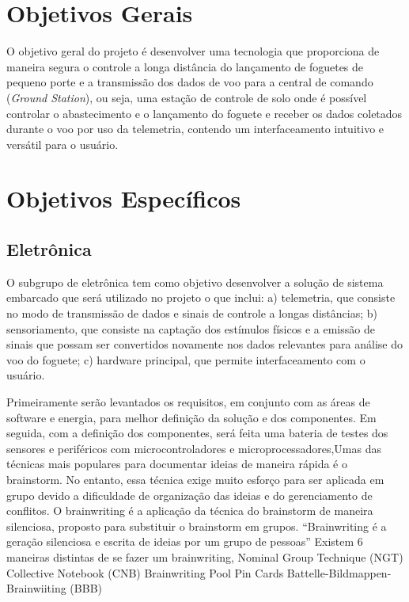 \section{Objetivos Gerais}

\par O objetivo geral do projeto é desenvolver uma tecnologia que proporciona de maneira segura o controle a longa distância do lançamento de foguetes de pequeno porte e a transmissão dos dados de voo para a central de comando (\textit{Ground Station}), ou seja, uma estação de controle de solo onde é possível controlar o abastecimento e o lançamento do foguete e receber os dados coletados durante o voo por uso da telemetria, contendo um interfaceamento intuitivo e versátil para o usuário.

\section{Objetivos Específicos}

\subsection{Eletrônica}

\par O subgrupo de eletrônica tem como objetivo  desenvolver a solução de sistema embarcado que será utilizado no projeto o que inclui: a) telemetria, que consiste no modo de transmissão de dados e sinais de controle a longas distâncias; b) sensoriamento, que consiste na captação dos estímulos físicos e a emissão de  sinais que possam ser convertidos novamente nos dados relevantes para análise do voo do foguete; c) hardware principal, que permite interfaceamento com o usuário.

\par Primeiramente serão levantados os requisitos, em conjunto com as áreas de software e energia, para melhor definição da solução e dos componentes. Em seguida, com a definição dos componentes, será feita uma bateria de testes dos sensores e periféricos com microcontroladores e microprocessadores,Umas das técnicas mais populares para documentar ideias de maneira rápida é o brainstorm. No entanto, essa técnica exige muito esforço para ser aplicada em grupo devido a dificuldade de organização das ideias e do gerenciamento de conflitos.
O brainwriting é a aplicação da técnica do brainstorm de maneira silenciosa, proposto para substituir o brainstorm em grupos. 
“Brainwriting é a geração silenciosa e escrita de ideias por um grupo de pessoas”
Existem 6 maneiras distintas de se fazer um brainwriting,
Nominal Group Technique (NGT)
Collective Notebook (CNB)
Brainwriting Pool
Pin Cards
Battelle-Bildmappen-Brainwiiting (BBB)

